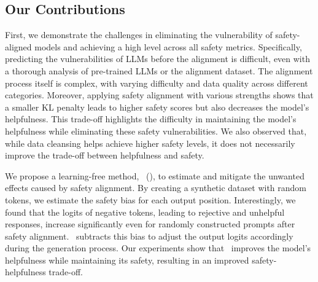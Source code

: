 \subsection*{Our Contributions}

First, we demonstrate the challenges in eliminating the vulnerability of safety-aligned models and achieving a high level across all safety metrics. Specifically, predicting the vulnerabilities of LLMs before the alignment is difficult, even with a thorough analysis of pre-trained LLMs or the alignment dataset. The alignment process itself is complex, with varying difficulty and data quality across different categories. Moreover, applying safety alignment with various strengths shows that a smaller KL penalty leads to higher safety scores but also decreases the model's helpfulness. This trade-off highlights the difficulty in maintaining the model's helpfulness while eliminating these safety vulnerabilities. We also observed that, while data cleansing helps achieve higher safety levels, it does not necessarily improve the trade-off between helpfulness and safety.

We propose a learning-free method, \algo~(\algoshort), to estimate and mitigate the unwanted effects caused by safety alignment. By creating a synthetic dataset with random tokens, we estimate the safety bias for each output position. Interestingly, we found that the logits of negative tokens, leading to rejective and unhelpful responses, increase significantly even for randomly constructed prompts after safety alignment. \algoshort~subtracts this bias to adjust the output logits accordingly during the generation process. Our experiments show that \algoshort~improves the model's helpfulness while maintaining its safety, resulting in an improved safety-helpfulness trade-off.